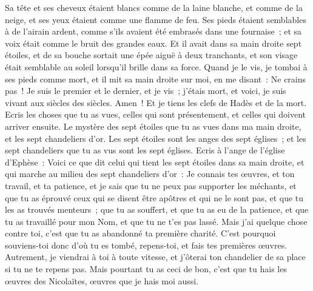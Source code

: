 \begin{multicols}{2}
Sa tête et ses cheveux étaient blancs comme de la laine blanche, et comme de la neige, et ses yeux étaient comme une flamme de feu.
Ses pieds étaient semblables à de l'airain ardent, comme s'ils avaient été embrasés dans une fournaise~; et sa voix était comme le bruit des grandes eaux.
Et il avait dans sa main droite sept étoiles, et de sa bouche sortait une épée aiguë à deux tranchants, et son visage était semblable au soleil lorsqu'il brille dans sa force.
Quand je le vis, je tombai à ses pieds comme mort, et il mit sa main droite sur moi, en me disant~: Ne crains pas~!
Je suis le premier et le dernier, et je vis~; j'étais mort, et voici, je suis vivant aux siècles des siècles. Amen~! Et je tiens les clefs de Hadès et de la mort.
Ecris les choses que tu as vues, celles qui sont présentement, et celles qui doivent arriver ensuite.
Le mystère des sept étoiles que tu as vues dans ma main droite, et les sept chandeliers d'or. Les sept étoiles sont les anges des sept églises~; et les sept chandeliers que tu as vus sont les sept églises.
\VerseOne{}Ecris à l'ange de l'église d'Ephèse~: Voici ce que dit celui qui tient les sept étoiles dans sa main droite, et qui marche au milieu des sept chandeliers d'or~:
Je connais tes œuvres, et ton travail, et ta patience, et je sais que tu ne peux pas supporter les méchants, et que tu as éprouvé ceux qui se disent être apôtres et qui ne le sont pas, et que tu les as trouvés menteurs~;
que tu as souffert, et que tu as eu de la patience, et que tu as travaillé pour mon Nom, et que tu ne t'es pas lassé.
Mais j'ai quelque chose contre toi, c'est que tu as abandonné ta première charité.
C'est pourquoi souviens-toi donc d'où tu es tombé, repens-toi, et fais tes premières œuvres. Autrement, je viendrai à toi à toute vitesse, et j'ôterai ton chandelier de sa place si tu ne te repens pas.
Mais pourtant tu as ceci de bon, c'est que tu hais les œuvres des Nicolaïtes, œuvres que je hais moi aussi.

\end{multicols}
